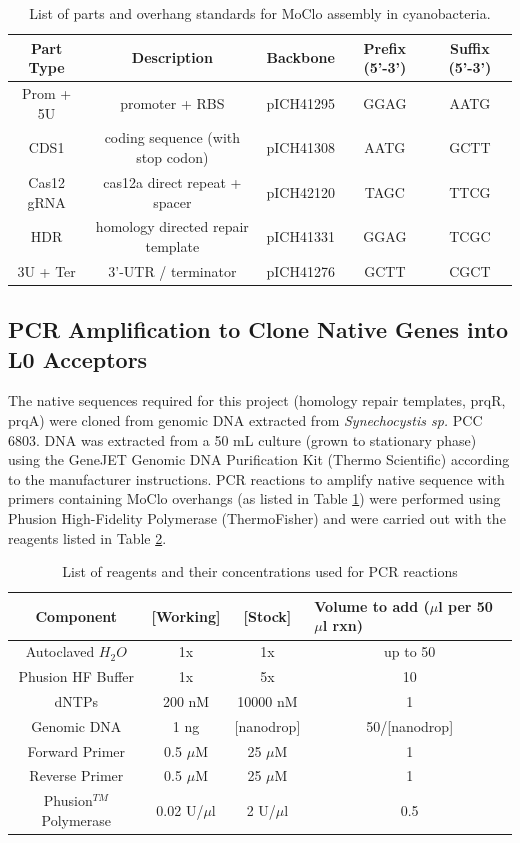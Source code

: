\begin{table}[H]
\begin{tabular}{|c|c|c|c|c|}
\hline
\textbf{Part Type} & \textbf{Description} & \textbf{Backbone} & \textbf{Prefix (5'-3')} & \textbf{Suffix (5'-3')} \\ \hline
Prom + 5U & promoter + RBS & pICH41295 & GGAG & AATG \\ \hline
CDS1 & coding sequence (with stop codon) & pICH41308 & AATG & GCTT \\ \hline
Cas12 gRNA & cas12a direct repeat + spacer & pICH42120 & TAGC & TTCG \\ \hline
HDR & homology directed repair template & pICH41331 & GGAG & TCGC \\ \hline
3U + Ter & 3'-UTR / terminator & pICH41276 & GCTT & CGCT \\ \hline
\end{tabular}
\caption{List of parts and overhang standards for MoClo assembly in cyanobacteria.}
\label{table:overhangs}
\end{table}

\subsection{PCR Amplification to Clone Native Genes into L0 Acceptors}
\label{sec:PCR}

The native sequences required for this project (homology repair templates, prqR, prqA) were cloned from genomic DNA extracted from \textit{Synechocystis sp.} PCC 6803. DNA was extracted from a 50 mL culture (grown to stationary phase) using the GeneJET Genomic DNA Purification Kit (Thermo Scientific)  according to the manufacturer instructions.
PCR reactions to amplify native sequence with primers containing MoClo overhangs (as listed in Table \ref{table:overhangs}) were performed using Phusion High-Fidelity Polymerase (ThermoFisher) and were carried out with the reagents listed in Table \ref{table:PCRreagents}.

\begin{table}[H]
\begin{tabular}{|c|c|c|c|}
\hline
\textbf{Component} & \textbf{[Working]} & \textbf{[Stock]} & \multicolumn{1}{l|}{\textbf{Volume to add ($\mu$l per 50 $\mu$l rxn)}} \\ \hline
Autoclaved $H_{2}O$ & 1x & 1x & up to 50 \\ \hline
Phusion HF Buffer & 1x & {\color[HTML]{333333} 5x} & 10 \\ \hline
dNTPs & 200 nM & {\color[HTML]{333333} 10000 nM} & 1 \\ \hline
Genomic DNA & {\color[HTML]{000000} 1 ng} & {\color[HTML]{333333} [nanodrop]} & 50/[nanodrop] \\ \hline
Forward Primer & 0.5 $\mu$M & 25 $\mu$M & 1 \\ \hline
Reverse Primer & 0.5 $\mu$M & 25 $\mu$M & 1 \\ \hline
Phusion$^{TM}$ Polymerase & 0.02 U/$\mu$l & 2 U/$\mu$l & 0.5 \\ \hline
\end{tabular}
\caption{List of reagents and their concentrations used for  PCR reactions}
\label{table:PCRreagents}
\end{table}

